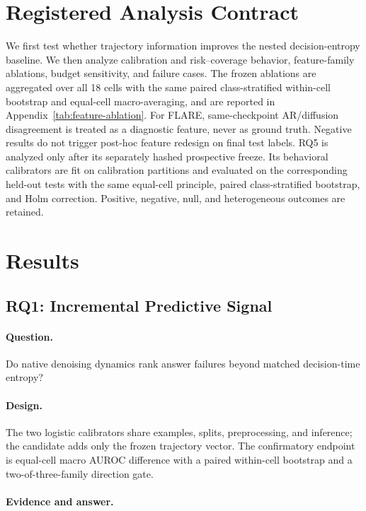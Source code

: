 \documentclass[10pt]{article}
\begin{document}
\section{Registered Analysis Contract}

We first test whether trajectory information improves the nested decision-entropy baseline.
We then analyze calibration and risk--coverage behavior, feature-family ablations, budget sensitivity, and failure cases. The frozen ablations are aggregated over all 18 cells with the same paired class-stratified within-cell bootstrap and equal-cell macro-averaging, and are reported in Appendix~\ref{tab:feature-ablation}.
For FLARE, same-checkpoint AR/diffusion disagreement is treated as a diagnostic feature, never as ground truth.
Negative results do not trigger post-hoc feature redesign on final test labels.
RQ5 is analyzed only after its separately hashed prospective freeze. Its behavioral calibrators are fit on calibration partitions and evaluated on the corresponding held-out tests with the same equal-cell principle, paired class-stratified bootstrap, and Holm correction. Positive, negative, null, and heterogeneous outcomes are retained.

\section{Results}
\label{sec:results}

\subsection{RQ1: Incremental Predictive Signal}

\paragraph{Question.} Do native denoising dynamics rank answer failures beyond matched decision-time entropy?
\paragraph{Design.} The two logistic calibrators share examples, splits, preprocessing, and inference; the candidate adds only the frozen trajectory vector. The confirmatory endpoint is equal-cell macro AUROC difference with a paired within-cell bootstrap and a two-of-three-family direction gate.
\paragraph{Evidence and answer.} \ResultsResultSentence
\end{document}
